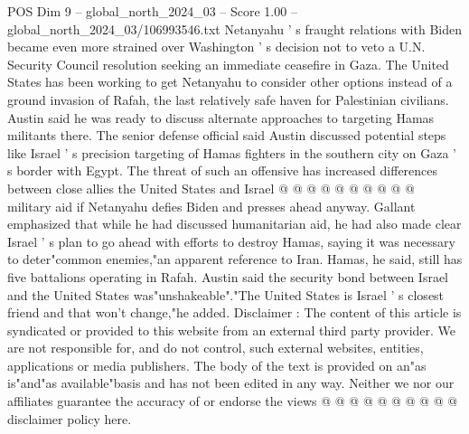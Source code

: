 \begin{textsample}{POS Dim 9 – global\_north\_2024\_03 – Score 1.00 – global\_north\_2024\_03/106993546.txt}
Netanyahu ' s fraught relations with Biden became even more strained over Washington ' s decision not to veto a U.N.
Security Council resolution seeking an immediate ceasefire in Gaza.
The United States has been working to get Netanyahu to consider other options instead of a ground invasion of Rafah, the last relatively safe haven for Palestinian civilians.
Austin said he was ready to discuss alternate approaches to targeting Hamas militants there.
The senior defense official said Austin discussed potential steps like Israel ' s precision targeting of Hamas fighters in the southern city on Gaza ' s border with Egypt.
The threat of such an offensive has increased differences between close allies the United States and Israel @ @ @ @ @ @ @ @ @ @ military aid if Netanyahu defies Biden and presses ahead anyway.
Gallant emphasized that while he had discussed humanitarian aid, he had also made clear Israel ' s plan to go ahead with efforts to destroy Hamas, saying it was necessary to deter"common enemies,"an apparent reference to Iran.
Hamas, he said, still has five battalions operating in Rafah.
Austin said the security bond between Israel and the United States was"unshakeable"."The United States is Israel ' s closest friend and that won't change,"he added.
Disclaimer : The content of this article is syndicated or provided to this website from an external third party provider.
We are not responsible for, and do not control, such external websites, entities, applications or media publishers.
The body of the text is provided on an"as is"and"as available"basis and has not been edited in any way.
Neither we nor our affiliates guarantee the accuracy of or endorse the views @ @ @ @ @ @ @ @ @ @ disclaimer policy here.

\end{textsample}
